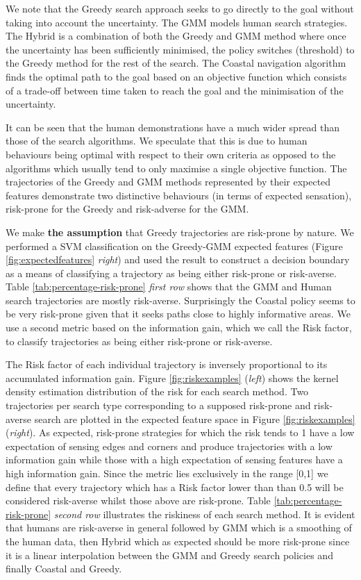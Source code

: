 We note that the Greedy search approach seeks to go directly to the goal without taking into account 
the uncertainty. The GMM models human search strategies. The Hybrid is a combination of both the Greedy and GMM method 
where once the uncertainty has been sufficiently minimised, the policy switches (threshold) to the Greedy method for the rest of 
the search. The Coastal navigation algorithm finds the optimal path to the goal based on an objective function which
consists of a trade-off between time taken to reach the goal and the minimisation of the uncertainty.

It can be seen that the human demonstrations have a much wider spread than those of the search algorithms. 
We speculate that this is due to human behaviours being optimal with respect to their own criteria as opposed to the algorithms 
which usually tend to only maximise a single objective function. The trajectories of the Greedy and GMM methods represented by their 
expected features demonstrate two distinctive behaviours (in terms of expected sensation), risk-prone for the Greedy and risk-adverse
for the GMM.

We make \textbf{the assumption} that Greedy trajectories are risk-prone by nature. We performed a SVM classification on the 
Greedy-GMM expected features (Figure \ref{fig:expectedfeatures} \textit{right}) and used the result to construct a decision boundary as a means
of classifying a trajectory as being either risk-prone or risk-averse. Table \ref{tab:percentage-risk-prone} \textit{first row} shows that
the GMM and Human search trajectories are mostly risk-averse. Surprisingly the Coastal policy seems to be very risk-prone given 
that it seeks paths close to highly informative areas.
We use a second metric based on the information gain, which we call the Risk factor, to classify trajectories as being either 
risk-prone or risk-averse.

The Risk factor of each individual trajectory is inversely proportional to its accumulated information gain. Figure \ref{fig:riskexamples} (\textit{left}) shows the kernel density estimation distribution of the risk 
for each search method. Two trajectories per search type corresponding to a supposed risk-prone and risk-averse search
are plotted in the expected feature space in Figure \ref{fig:riskexamples} (\textit{right}). As expected, risk-prone strategies 
for which the risk tends to 1 have a low expectation of sensing edges and corners and produce trajectories with a 
low information gain while those with a high expectation of sensing features have a high information gain. 
Since the metric lies exclusively in the range [0,1] we define that every trajectory which has a Risk factor lower than than 0.5 will 
be considered risk-averse whilst those above are risk-prone. Table \ref{tab:percentage-risk-prone} \textit{second row} illustrates
the riskiness of each search method. It is evident that humans are risk-averse in general followed by GMM which is a smoothing 
of the human data, then Hybrid which as expected should be more risk-prone since it is a linear interpolation between the GMM and 
Greedy search policies and finally Coastal and Greedy.

